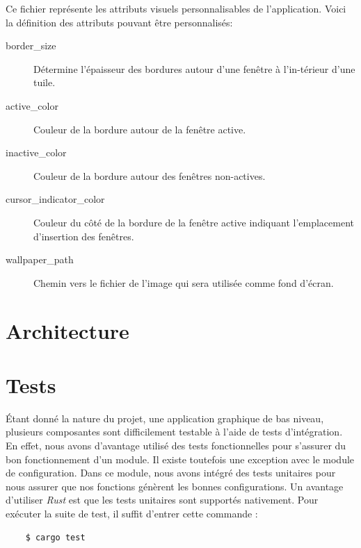 \documentclass[titlepage]{article}
\begin{document}
\par
Ce fichier représente les attributs visuels personnalisables de l'application. Voici la définition des attributs pouvant être personnalisés:
\begin{description}
	\item [border\_size] Détermine l'épaisseur des bordures autour d'une fenêtre à l'in-térieur d'une tuile.
	\item [active\_color] Couleur de la bordure autour de la fenêtre active.
	\item [inactive\_color] Couleur de la bordure autour des fenêtres non-actives.
	\item [cursor\_indicator\_color] Couleur du côté de la bordure de la fenêtre active indiquant l'emplacement d'insertion des fenêtres.
	\item [wallpaper\_path] Chemin vers le fichier de l'image qui sera utilisée comme fond d'écran.
\end{description}

\section{Architecture}
\section{Tests}
Étant donné la nature du projet, une application graphique de bas niveau, plusieurs composantes sont difficilement testable à l'aide de tests d'intégration. En effet, nous avons d'avantage utilisé des tests fonctionnelles pour s'assurer du bon fonctionnement d'un module. Il existe toutefois une exception avec le module de configuration. Dans ce module, nous avons intégré des tests unitaires pour nous assurer que nos fonctions génèrent les bonnes configurations. Un avantage d'utiliser \textit{Rust} est que les tests unitaires sont supportés nativement. Pour exécuter la suite de test, il suffit d'entrer cette commande :
\begin{verbatim}
	$ cargo test
\end{verbatim}
\end{document}
